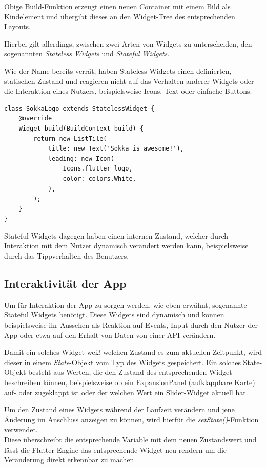 Obige Build-Funktion erzeugt einen neuen Container mit einem Bild als Kindelement und übergibt dieses
an den Widget-Tree des entsprechenden Layouts.

Hierbei gilt allerdings, zwischen zwei Arten von Widgets zu unterscheiden, den sogenannten \textit{Stateless Widgets}
und \textit{Stateful Widgets}.

Wie der Name bereits verrät, haben Stateless-Widgets einen definierten, statischen Zustand und reagieren nicht
auf das Verhalten anderer Widgets oder die Interaktion eines Nutzers, beispielsweise Icons, Text oder einfache
Buttons.

\begin{lstlisting}
class SokkaLogo extends StatelessWidget {
    @override
    Widget build(BuildContext build) {
        return new ListTile(
            title: new Text('Sokka is awesome!'),
            leading: new Icon(
                Icons.flutter_logo,
                color: colors.White,
            ),
        );
    }
}
\end{lstlisting}

Stateful-Widgets dagegen haben einen internen Zustand, welcher durch Interaktion mit dem Nutzer dynamisch verändert
werden kann, beispielsweise durch das Tippverhalten des Benutzers.

\subsection{Interaktivität der App}


Um für Interaktion der App zu sorgen werden, wie eben erwähnt, sogenannte Stateful Widgets benötigt.
Diese Widgets sind dynamisch und können beispielsweise ihr Aussehen als Reaktion auf Events, Input durch
den Nutzer der App oder etwa auf den Erhalt von Daten von einer API verändern.

Damit ein solches Widget weiß welchen Zustand es zum aktuellen Zeitpunkt, wird dieser in einem \textit{State}-Objekt vom Typ
des Widgets gespeichert. Ein solches State-Objekt besteht aus Werten, die den Zustand des entsprechenden Widget beschreiben können,
beispielsweise ob ein ExpansionPanel (aufklappbare Karte) auf- oder zugeklappt ist oder der welchen Wert ein Slider-Widget
aktuell hat.

Um den Zustand eines Widgets während der Laufzeit verändern und jene Änderung im Anschluss anzeigen zu können,
wird hierfür die \textit{setState()}-Funktion verwendet.\\
Diese überschreibt die entsprechende Variable mit dem neuen Zustandswert und lässt die Flutter-Engine das entsprechende
Widget neu rendern um die Veränderung direkt erkennbar zu machen.

